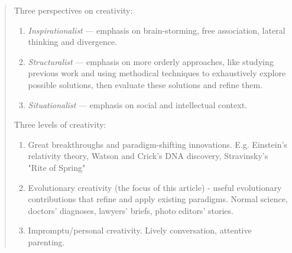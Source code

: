 		\begin{quote}
		\small
		Three perspectives on creativity:
		\begin{enumerate}
		
		\item \emph{Inspirationalist} --- emphasis on brain-storming, free association,
		lateral thinking and divergence. 
		
		\item \emph{Structuralist} --- emphasis on more orderly approaches, like studying
		previous work and using methodical techniques to
		exhaustively explore possible solutions, then evaluate these solutions
		and refine them. 
		
		\item \emph{Situationalist} --- emphasis on social and intellectual context. 
		
		\end{enumerate}
		
		
		Three levels of creativity:
		
		\begin{enumerate}
		
		\item Great breakthroughs and paradigm-shifting
		innovations. E.g. Einstein's relativity theory, Watson
		and Crick's DNA discovery, Stravinsky's "Rite of Spring"
		
		\item Evolutionary creativity (the focus of this
		article) - useful evolutionary contributions that refine
		and apply existing paradigms. Normal science, doctors' diagnoses,
		lawyers' briefs, photo editors' stories.
		
		\item Impromptu/personal creativity. Lively
		conversation, attentive parenting.
		
		\end{enumerate}
		

\end{quote}
